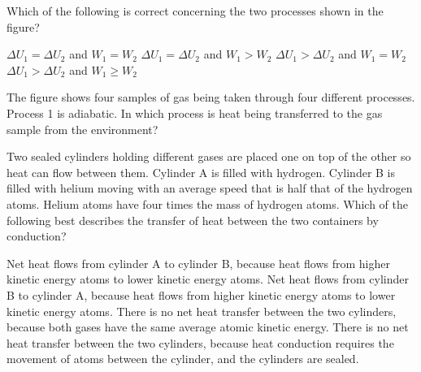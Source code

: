 \documentclass{../../../oss-ap12ibhl}
\begin{document}
\begin{questions}
  \question Which of the following is correct concerning the two processes shown
  in the figure?
  
  \begin{minipage}{.35\textwidth}
  \end{minipage}
  \begin{minipage}{.4\textwidth}
    \begin{choices}
      \choice $\Delta U_1 = \Delta U_2$ and $W_1= W_2$
      \choice $\Delta U_1 = \Delta U_2$ and $W_1>W_2$
      \choice $\Delta U_1 > \Delta U_2$ and $W_1=W_2$
      \choice $\Delta U_1 > \Delta U_2$ and $W_1\geq W_2$
    \end{choices}
  \end{minipage}
  
  \question The figure shows four samples of gas being taken through four
  different processes. Process 1 is adiabatic. In which process is heat being
  transferred to the gas sample from the environment?

  \begin{minipage}{.35\textwidth}
  \end{minipage}
  \begin{minipage}{.2\textwidth}
    \begin{choices}
    \end{choices}
  \end{minipage}
    
  \question Two sealed cylinders holding different gases are placed one on top
  of the other so heat can flow between them. Cylinder A is filled with
  hydrogen. Cylinder B is filled with helium moving with an average speed that
  is half that of the hydrogen atoms. Helium atoms have four times the mass of
  hydrogen atoms. Which of the following best describes the transfer of heat
  between the two containers by conduction?
  \begin{choices}
    \choice Net heat flows from cylinder A to cylinder B, because heat flows
    from higher kinetic energy atoms to lower kinetic energy atoms.
    \choice Net heat flows from cylinder B to cylinder A, because heat flows
    from higher kinetic energy atoms to lower kinetic energy atoms.
    \choice There is no net heat transfer between the two cylinders, because
    both gases have the same average atomic kinetic energy.
    \choice There is no net heat transfer between the two cylinders, because
    heat conduction requires the movement of atoms between the cylinder, and the
    cylinders are sealed.
  \end{choices}
  \newpage
  

\end{questions}
\end{document}
